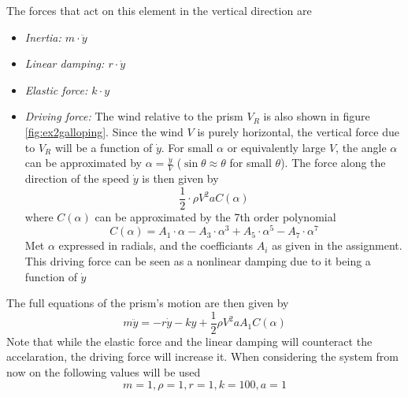 The forces that act on this element in the vertical direction are
\begin{itemize}
\item \textit{Inertia: $m\cdot \ddot{y}$}
\item \textit{Linear damping: $r\cdot\dot{y}$}
\item \textit{Elastic force: $k\cdot{y}$}
\item \textit{Driving force:} The wind relative to the prism $V_R$ is also shown in figure \ref{fig:ex2galloping}. Since the wind $V$ is purely horizontal, the vertical force due to $V_R$ will be a function of $\dot{y}$. For small $\alpha$ or equivalently large $V$, the angle $\alpha$ can be approximated by $\alpha=\frac{\dot{y}}{V}$ ($\sin{\theta}\approx \theta$ for small $\theta$). The force along the direction of the speed $\dot{y}$ is then given by
\begin{equation}
\frac{1}{2}\cdot\rho V^2aC(\alpha)
\end{equation}
where $C(\alpha)$ can be approximated by the 7th order polynomial
\begin{equation}\label{eqn:ex2calpha}
C(\alpha) = A_1\cdot \alpha-A_3 \cdot \alpha^3 + A_5\cdot \alpha^5 - A_7\cdot \alpha^7
\end{equation}
Met $\alpha$ expressed in radials, and the coefficiants $A_i$ as given in the assignment. This driving force can be seen as a nonlinear damping due to it being a function of $\dot{y}$
\end{itemize}
The full equations of the prism's motion are then given by
\begin{equation}\label{eqn:ex2model1line}
m\ddot{y}=-r\dot{y}-ky+\frac{1}{2}\rho V^2 a A_1 C(\alpha)
\end{equation}
\hfill\newline
Note that while the elastic force and the linear damping will counteract the accelaration, the driving force will increase it. When considering the system from now on the following values will be used
 \begin{equation}\label{eqn:ex2numericvalues}
m=1,\rho=1,r=1,k=100,a=1
\end{equation}


